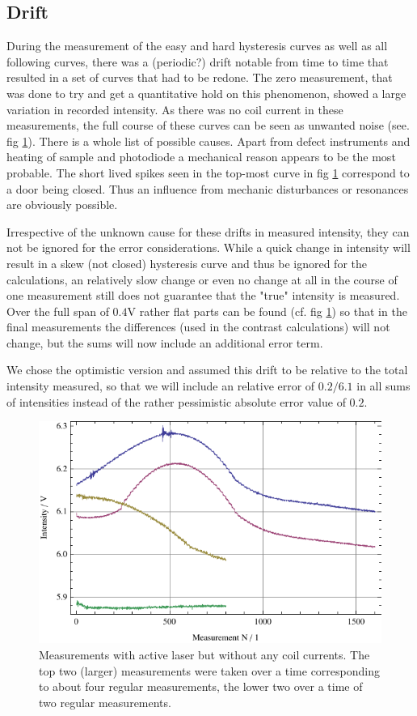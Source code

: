 \documentclass[a4paper]{scrartcl}
\numberwithin{equation}{section}
\numberwithin{figure}{section}
\numberwithin{table}{section}
\begin{document}
\subsection{Drift}
During the measurement of the easy and hard hysteresis curves as well as all following curves, there was a (periodic?) drift notable from time to time that resulted in a set of curves that had to be redone. The zero measurement, that was done to try and get a quantitative hold on this phenomenon, showed a large variation in recorded intensity. As there was no coil current in these measurements, the full course of these curves can be seen as unwanted noise (see. fig \ref{fig:waal}). There is a whole list of possible causes. Apart from defect instruments and heating of sample and photodiode a mechanical reason appears to be the most probable. The short lived spikes seen in the top-most curve in fig \ref{fig:waal} correspond to a door being closed. Thus an influence from mechanic disturbances or resonances are obviously possible.

Irrespective of the unknown cause for these drifts in measured intensity, they can not be ignored for the error considerations. While a quick change in intensity will result in a skew (not closed) hysteresis curve and thus be ignored for the calculations, an relatively slow change or even no change at all in the course of one measurement still does not guarantee that the "true" intensity is measured. Over the full span of $0.4$V rather flat parts can be found (cf. fig \ref{fig:waal}) so that in the final measurements the differences (used in the contrast calculations) will not change, but the sums will now include an additional error term.%

We chose the optimistic version and assumed this drift to be relative to the total intensity measured, so that we will include an relative error of $0.2/6.1$ in all sums of intensities instead of the rather pessimistic absolute error value of $0.2$.
\begin{figure} 
 \centering
         \includegraphics[width=0.45\linewidth]{img/drift.pdf}
\caption{
\small Measurements with active laser but without any coil currents. The top two (larger) measurements were taken over a time corresponding to about four regular measurements, the lower two over a time of two regular measurements. } 
	\label{fig:waal}
\end{figure}
\end{document}
